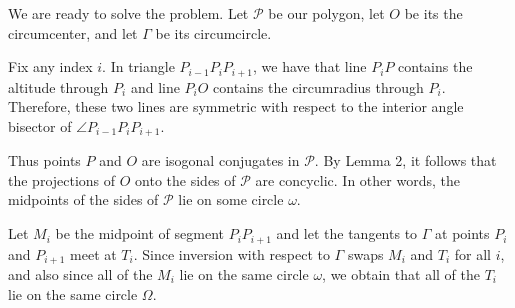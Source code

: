 \documentclass[11pt]{scrartcl}
\begin{document}
We are ready to solve the problem.
Let $\mathcal{P}$ be our polygon,
let $O$ be its the circumcenter,
and let $\Gamma$ be its circumcircle.

Fix any index $i$. In triangle $P_{i - 1}P_iP_{i + 1}$,
we have that line $P_iP$ contains the altitude through $P_i$
and line $P_iO$ contains the circumradius through $P_i$.
Therefore, these two lines are symmetric with respect
to the interior angle bisector of $\angle P_{i - 1}P_iP_{i + 1}$.

Thus points $P$ and $O$ are isogonal conjugates in $\mathcal{P}$.
By Lemma 2, it follows that the projections of $O$
onto the sides of $\mathcal{P}$ are concyclic.
In other words, the midpoints of the sides of
$\mathcal{P}$ lie on some circle $\omega$.

Let $M_i$ be the midpoint of segment $P_iP_{i + 1}$
and let the tangents to $\Gamma$ at points $P_i$ and $P_{i + 1}$ meet at $T_i$.
Since inversion with respect to $\Gamma$ swaps $M_i$ and $T_i$ for all $i$,
and also since all of the $M_i$ lie on the same circle $\omega$,
we obtain that all of the $T_i$ lie on the same circle $\Omega$.
\end{document}
